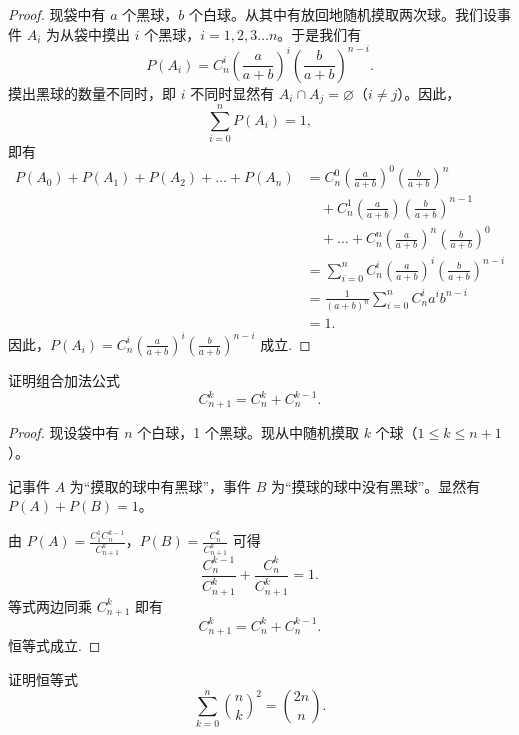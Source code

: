 \begin{proof}
  现袋中有 \(a\) 个黑球，\(b\) 个白球。从其中有放回地随机摸取两次球。我们设事件 \(A_i\) 为从袋中摸出 \(i\) 个黑球，\(i = 1,2,3\ldots n\)。于是我们有
\[
P(A_i) = C_{n}^{i} \left( \frac{a}{a + b} \right)^i \left( \frac{b}{a + b} \right)^{n - i}. 
\]
摸出黑球的数量不同时，即 \(i\) 不同时显然有 \(A_i \cap A_j = \varnothing\)（\(i \neq j\)）。因此，
\[
\sum_{i = 0}^{n} P(A_i) = 1,
\]
即有
\begin{align*}
P(A_0) + P(A_1) + P(A_2) + \ldots + P(A_n) &= C_{n}^{0} \left( \frac{a}{a + b} \right)^0 \left( \frac{b}{a + b} \right)^n \\
&\quad + C_{n}^{1} \left( \frac{a}{a + b} \right) \left( \frac{b}{a + b} \right)^{n - 1} \\
&\quad + \ldots + C_{n}^{n} \left( \frac{a}{a + b} \right)^n \left( \frac{b}{a + b} \right)^0 \\
&= \sum_{i = 0}^{n} C_{n}^{i} \left( \frac{a}{a + b} \right)^i \left( \frac{b}{a + b} \right)^{n - i} \\
&= \frac{1}{(a + b)^n} \sum_{i = 0}^{n} C_n^i a^i b^{n - i} \\
&= 1. 
\end{align*}
因此，\(P(A_i) = C_{n}^{i} \left( \frac{a}{a + b} \right)^i \left( \frac{b}{a + b} \right)^{n - i}\) 成立. 
\end{proof}


\begin{example}\label{example:例3. 2}
  证明组合加法公式 \[C_{n+1}^k = C_n^k + C_n^{k-1}. \]
\end{example}

\begin{proof}
现设袋中有 \(n\) 个白球，1 个黑球。现从中随机摸取 \(k\) 个球（\(1 \leq k \leq n + 1\)）。

记事件 \(A\) 为“摸取的球中有黑球”，事件 \(B\) 为“摸球的球中没有黑球”。显然有 \(P(A) + P(B) = 1\)。

由 \(P(A) = \frac{C_{1}^{1} C_{n}^{k - 1}}{C_{n + 1}^{k}}\)，\(P(B) = \frac{C_{n}^{k}}{C_{n + 1}^{k}}\) 可得
\[
\frac{C_{n}^{k - 1}}{C_{n + 1}^{k}} + \frac{C_{n}^{k}}{C_{n + 1}^{k}} = 1. 
\]
等式两边同乘 \(C_{n + 1}^{k}\) 即有
\[
C_{n + 1}^{k} = C_{n}^{k} + C_{n}^{k - 1}. 
\]
恒等式成立. 
\end{proof}

\begin{example}
  证明恒等式 \[\sum_{k=0}^n \binom{n}{k}^2 = \binom{2n}{n}. \]
\end{example}

